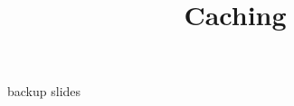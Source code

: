 \graphicspath{{./figures/}}
\title{Caching}
\date{}







\begin{frame}{backup slides}
\end{frame}




